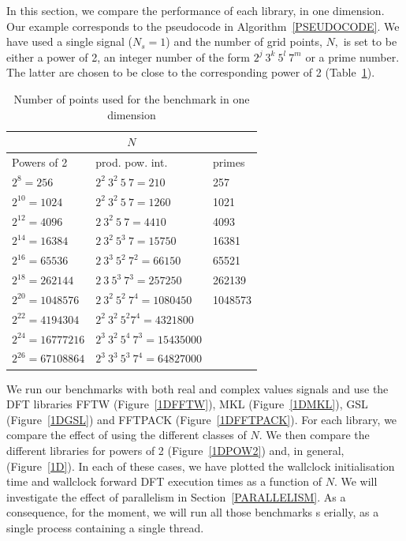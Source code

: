 \documentclass[12pt, a4paper]{article}
\begin{document}
In this section, we compare the performance of each library, in one dimension. 
Our example corresponds to the pseudocode in Algorithm~\ref{PSEUDOCODE}. We have 
used a single signal ($N_s=1$) and the number of grid points, $N,$ is set to be either a power of 2, 
an integer number of the form $2^j\ 3^k\ 5^l\ 7^m$ or a prime number. The latter are chosen to be 
close to the corresponding power of 2 (Table~\ref{SIZES1D}).
\begin{table}[H]
\captionsetup{width=0.8\linewidth}
\centering
\begin{tabular}{|l|l|l|}
  \hline
  \multicolumn{3}{|c|}{$N$}\\
  \hline
  \hline
Powers of 2 & prod. pow. int. & primes\\ \hline
$2^8=256$	 & $2^2\ 3^2\ 5\ 7=210$	     & 257  \\ \hline
$2^{10}=1024$	 & $2^2\ 3^2\ 5\ 7=1260$	     & 1021  \\ \hline
$2^{12}=4096$	 & $2\ 3^2\ 5\ 7=4410$	     & 4093 \\ \hline
$2^{14}=16384$	 & $2\ 3^2\ 5^3\ 7=15750$	     & 16381 \\ \hline
$2^{16}=65536$	 & $2\ 3^3\ 5^2\ 7^2=66150$      & 65521 \\ \hline
$2^{18}=262144$	 & $2\ 3\ 5^3\ 7^3=257250$       & 262139 \\ \hline
$2^{20}=1048576$  & $2\ 3^2\ 5^2\ 7^4=1080450$    & 1048573 \\ \hline
$2^{22}=4194304$  & $2^2\ 3^2\ 5^2 7^4=4321800$  &	\\ \hline
$2^{24}=16777216$ & $2^3\ 3^2\ 5^4\ 7^3=15435000$ &	\\ \hline
$2^{26}=67108864$ & $2^3\ 3^3\ 5^3\ 7^4=64827000$ &\\ \hline
\end{tabular}
\caption{Number of points used for the benchmark in one dimension}\label{SIZES1D}
\end{table}


 We run our benchmarks with both real and complex values signals and use the DFT libraries 
FFTW (Figure~\ref{1DFFTW}), MKL (Figure~\ref{1DMKL}), GSL (Figure~\ref{1DGSL}) and FFTPACK 
(Figure~\ref{1DFFTPACK}). For each library, we compare the effect of using the different 
classes of $N.$ We then compare the different libraries for powers of 2 (Figure~\ref{1DPOW2}) and, 
in general, (Figure~\ref{1D}). In each of these cases, we have plotted the wallclock initialisation time and 
wallclock forward DFT execution times as a function of $N.$ We will investigate the effect of parallelism in 
Section~\ref{PARALLELISM}. As a consequence, for the moment, we will run all those benchmarks s
erially, as a single process containing a single thread.
\end{document}
